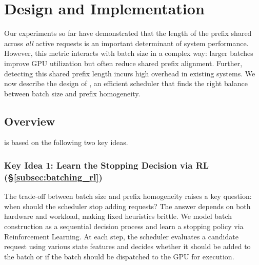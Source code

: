 \vspace{-6pt}

\section{Design and Implementation}
\label{sec:design}
Our experiments so far have demonstrated that the length of the prefix shared across \textit{all} active requests is an important determinant of system performance. However, this metric interacts with batch size in a complex way: larger batches improve GPU utilization but often reduce shared prefix alignment. Further, detecting this shared prefix length incurs high overhead in existing systems. We now describe the design of \Feather, an efficient scheduler that finds the right balance between batch size and prefix homogeneity. 

\vspace{-7pt}

\subsection{Overview}
\label{sec:system_overview}
\Feather is based on the following two key ideas.

\vspace{-6pt}

\subsubsection*{Key Idea 1: Learn the Stopping Decision via RL (\S\ref{subsec:batching_rl})}
The trade-off between batch size and prefix homogeneity raises a key question: when should the scheduler stop adding requests? The answer depends on both hardware and workload, making fixed heuristics brittle. We model batch construction as a sequential decision process and learn a stopping policy via Reinforcement Learning. At each step, the scheduler evaluates a candidate request using various state features and decides whether it should be added to the batch or if the batch should be dispatched to the GPU for execution.

\vspace{-6pt}

